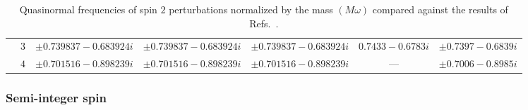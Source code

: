 \begin{table}[ht]
{\begin{tabular}{l |c|c|c|c|c|c}
          & $3$ & $\pm 0.739837-0.683924i$                  & $\pm 0.739837 -0.683924 i$                 & $\pm 0.739837 -0.683924 i$ & $0.7433-0.6783i$       & $\pm 0.7397-0.6839i$        \\
          & $4$ & $\pm 0.701516-0.898239i$                  & $\pm 0.701516 -0.898239 i$                 & $\pm 0.701516 -0.898239 i$ & ---                    & $\pm 0.7006-0.8985i$        \\
      \hline\hline
    \end{tabular}
  }
  \caption{
    Quasinormal frequencies of spin $2$ perturbations normalized by the mass $(M\omega)$ compared against the results of Refs.~\cite{Shu:2005fw, Konoplya:2004ip}.
  }
  \label{Tab:Spin2}
\end{table}

\subsubsection{Semi-integer spin}

